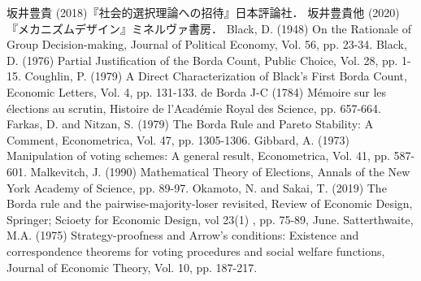 \documentclass[dvipdfmx]{jsarticle}
\begin{document}
\begin{thebibliography}{9}
  坂井豊貴 (2018)『社会的選択理論への招待』日本評論社．
  坂井豊貴他 (2020)『メカニズムデザイン』ミネルヴァ書房．
  Black, D. (1948) On the Rationale of Group Decision-making, Journal of Political Economy,
  Vol. 56, pp. 23-34.
  Black, D. (1976) Partial Justification of the Borda Count, Public Choice,
  Vol. 28, pp. 1-15.
  Coughlin, P. (1979) A Direct Characterization of Black's First Borda Count,
  Economic Letters, Vol. 4, pp. 131-133.
  de Borda J-C (1784) M\'{e}moire sur les \'{e}lections au scrutin, Histoire de l'Acad\'{e}mie
  Royal des Science, pp. 657-664.
  Farkas, D. and Nitzan, S. (1979) The Borda Rule and Pareto Stability: A Comment,
  Econometrica, Vol. 47, pp. 1305-1306.
  Gibbard, A. (1973) Manipulation of voting schemes: A general result, Econometrica, Vol. 41,
  pp. 587-601.
    Malkevitch, J. (1990) Mathematical Theory of Elections, Annals of the New York
    Academy of Science, pp. 89-97.
  Okamoto, N. and Sakai, T. (2019) The Borda rule and the pairwise-majority-loser
  revisited, Review of Economic Design, Springer; Scioety for Economic Design, vol 23(1)
  , pp. 75-89, June.
  Satterthwaite, M.A. (1975) Strategy-proofness and Arrow's conditions:
  Existence and correspondence theorems for voting procedures and social
  welfare functions, Journal of Economic Theory, Vol. 10, pp. 187-217.
\end{thebibliography}
\end{document}
